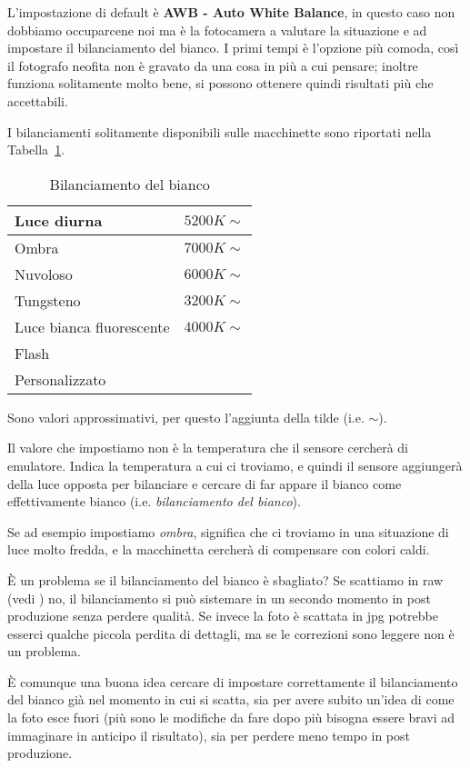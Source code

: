 L'impostazione di default è \textbf{AWB - Auto White Balance}, in questo caso non dobbiamo occuparcene noi ma è la fotocamera a valutare la situazione e ad impostare il bilanciamento del bianco.
I primi tempi è l'opzione più comoda, così il fotografo neofita non è gravato da una cosa in più a cui pensare; inoltre funziona solitamente molto bene, si possono ottenere quindi risultati più che accettabili.

I bilanciamenti solitamente disponibili sulle macchinette sono riportati nella Tabella~\ref{table:white_balance}.
\begin{table}[h]
    \centering
    \begin{tabular}{|l|l|} 
    \hline
    Luce diurna              & $5200K\sim$\\ 
    \hline
    Ombra                    & $7000K\sim$\\ 
    \hline
    Nuvoloso                 & $6000K\sim$\\ 
    \hline
    Tungsteno                & $3200K\sim$\\ 
    \hline
    Luce bianca fluorescente & $4000K\sim$\\ 
    \hline
    Flash                    &                           \\ 
    \hline
    Personalizzato           &                           \\
    \hline
    \end{tabular}
    \caption{Bilanciamento del bianco}
    \label{table:white_balance}
\end{table}

\nb Sono valori approssimativi, per questo l'aggiunta della tilde (i.e. $\sim$).

Il valore che impostiamo non è la temperatura che il sensore cercherà di emulatore. Indica la temperatura a cui ci troviamo, e quindi il sensore aggiungerà della luce opposta per bilanciare e cercare di far appare il bianco come effettivamente bianco (i.e. \textit{bilanciamento del bianco}).

Se ad esempio impostiamo \textit{ombra}, significa che ci troviamo in una situazione di luce molto fredda, e la macchinetta cercherà di compensare con colori caldi.

È un problema se il bilanciamento del bianco è sbagliato? Se scattiamo in raw (vedi ) no, il bilanciamento si può sistemare in un secondo momento in post produzione senza perdere qualità.
Se invece la foto è scattata in jpg potrebbe esserci qualche piccola perdita di dettagli, ma se le correzioni sono leggere non è un problema.

È comunque una buona idea cercare di impostare correttamente il bilanciamento del bianco già nel momento in cui si scatta, sia per avere subito un'idea di come la foto esce fuori (più sono le modifiche da fare dopo più bisogna essere bravi ad immaginare in anticipo il risultato), sia per perdere meno tempo in post produzione.